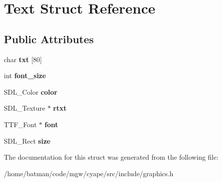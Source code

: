 \hypertarget{structText}{}\section{Text Struct Reference}
\label{structText}
\subsection*{Public Attributes}
\begin{DoxyCompactItemize}
\item 
\hypertarget{structText_ade2eba641e99dd2360f7e5eac0698f7e}{}char {\bfseries txt} \mbox{[}80\mbox{]}\label{structText_ade2eba641e99dd2360f7e5eac0698f7e}

\item 
\hypertarget{structText_af817d91902a4bea87ee5597267deef70}{}int {\bfseries font\+\_\+size}\label{structText_af817d91902a4bea87ee5597267deef70}

\item 
\hypertarget{structText_ab0f771bd18d8e968f7aaee4a4e26e385}{}S\+D\+L\+\_\+\+Color {\bfseries color}\label{structText_ab0f771bd18d8e968f7aaee4a4e26e385}

\item 
\hypertarget{structText_aeaf314a545c9256501b0b08abfada020}{}S\+D\+L\+\_\+\+Texture $\ast$ {\bfseries rtxt}\label{structText_aeaf314a545c9256501b0b08abfada020}

\item 
\hypertarget{structText_ae23ac53acb57e760b91c81d8c4aec8c7}{}T\+T\+F\+\_\+\+Font $\ast$ {\bfseries font}\label{structText_ae23ac53acb57e760b91c81d8c4aec8c7}

\item 
\hypertarget{structText_ac161c82e20b08400ddb7c76132db639b}{}S\+D\+L\+\_\+\+Rect {\bfseries size}\label{structText_ac161c82e20b08400ddb7c76132db639b}

\end{DoxyCompactItemize}


The documentation for this struct was generated from the following file\+:\begin{DoxyCompactItemize}
\item 
/home/batman/code/mgw/cyape/src/include/graphics.\+h\end{DoxyCompactItemize}
